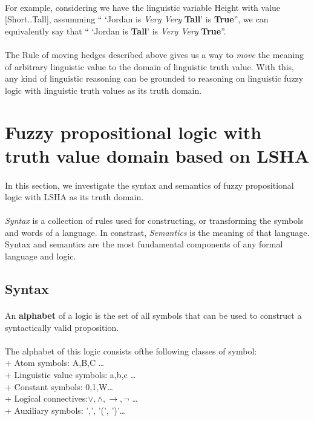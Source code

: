 \documentclass[part1.tex]{subfiles}
\begin{document}
\paragraph{} For example, considering we have the linguistic
variable Height with value [Short..Tall], assumming `` `Jordan is
{\em Very Very} {\bf Tall}' is {\bf True}'', we can equivalently
say that `` `Jordan is {\bf Tall}' is {\em Very Very} {\bf
True}''. 
\paragraph{} The Rule of moving hedges described above gives us a
way to {\em move} the meaning of arbitrary linguistic value to
the domain of linguistic truth value. With this, any kind of
linguistic reasoning can be grounded to reasoning on linguistic
fuzzy logic with linguistic truth values as its truth domain.
\section{Fuzzy propositional logic with truth value domain based on
LSHA}
\paragraph{} In this section, we investigate the syntax and
semantics of fuzzy propositional logic with LSHA as its truth
domain. 
\paragraph{} {\em Syntax} is a collection of rules used for
constructing, or transforming the symbols and words of a
language. In constrast, {\em Semantics} is the meaning of that
language. Syntax and semantics are the most fundamental
components of any formal language and logic.
\subsection{Syntax}
\paragraph{} An {\bfseries alphabet} of a logic is the set of
all symbols that can be used to construct a syntactically valid
proposition.
\paragraph{} The alphabet of this logic consists
ofthe following classes of symbol:\\
\indent + Atom symbols: A,B,C \ldots\\
\indent + Linguistic value symbols: a,b,c \ldots\\
\indent + Constant symbols: 0,1,W\ldots\\
\indent + Logical connectives:\(\vee,\wedge,\to,\neg\) \ldots\\
\indent + Auxiliary symbols: ',', '(', ')'\ldots\\ \\
\end{document}
